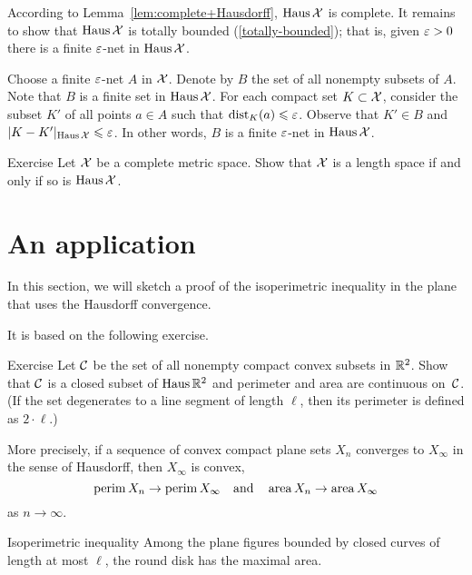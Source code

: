 According to Lemma~\ref{lem:complete+Hausdorff},
$\operatorname{\rm Haus}\nolimits\mathcal{X}$ is complete.
It remains to show that $\operatorname{\rm Haus}\nolimits\mathcal{X}$ is totally bounded (\ref{totally-bounded});
that is, given $\varepsilon>0$ there is a finite $\varepsilon$-net in $\operatorname{\rm Haus}\nolimits\mathcal{X}$.

Choose a finite $\varepsilon$-net $A$ in $\mathcal{X}$.
Denote by $B$ the set of all nonempty subsets of $A$.
Note that  $B$ is a finite set in $\operatorname{\rm Haus}\nolimits\mathcal{X}$.
For each compact set $K\subset \mathcal{X}$, consider the subset $K'$ of all points $a\in A$
such that $\mathrm{dist}_K(a)\leqslant \varepsilon$.
Observe that $K' \in B$ and $|K-K'|_{\operatorname{\rm Haus}\nolimits\mathcal{X}}\leqslant\varepsilon$.
In other words, $B$ is a finite $\varepsilon$-net in $\operatorname{\rm Haus}\nolimits\mathcal{X}$.
\qeds

\begin{thm}{Exercise}\label{ex:Haus-length}
Let $\mathcal{X}$ be a complete metric space.
Show that $\mathcal{X}$ is a length space if and only if so is $\operatorname{\rm Haus}\nolimits\mathcal{X}$.
\end{thm}

\section{An application}


In this section, we will sketch a proof of the isoperimetric inequality in the plane that uses the Hausdorff convergence.

It is based on the following exercise.

\begin{thm}{Exercise}\label{ex:Huas-perimeter-area}
Let $\mathcal{C}$ be the set of all nonempty compact convex subsets in $\mathbb{R}^2$.
Show that $\mathcal{C}$ is a closed subset of $\operatorname{\rm Haus}\nolimits\mathbb{R}^2$ and 
perimeter and area are continuous on~$\mathcal{C}$.
(If the set degenerates to a line segment of length $\ell$, then its perimeter is defined as $2\cdot \ell$.)

More precisely, if a sequence of convex compact plane sets $X_n$ converges to $X_\infty$ in the sense of Hausdorff, then $X_\infty$ is convex,
\[\operatorname{\rm perim}\nolimits X_n\to \operatorname{\rm perim}\nolimits X_\infty\quad\text{and}\quad\operatorname{\rm area}\nolimits X_n\to\operatorname{\rm area}\nolimits X_\infty\]
as $n\to\infty$.
\end{thm}


\begin{thm}{Isoperimetric inequality}\label{thm:isoperimetric}
Among the plane figures bounded by closed curves of length at most $\ell$, the round disk has the maximal area.
\end{thm}

